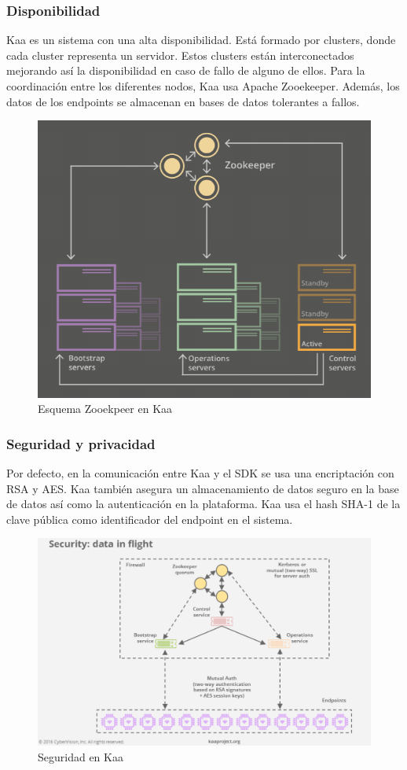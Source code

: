 \documentclass[12pt, twoside]{book}
\begin{document}
\subsubsection*{Disponibilidad}
Kaa es un sistema con una alta disponibilidad. Está formado por clusters, donde cada cluster representa un servidor. Estos clusters están interconectados mejorando así la disponibilidad en caso de fallo de alguno de ellos. Para la coordinación entre los diferentes nodos, Kaa usa Apache Zooekeeper. Además, los datos de los endpoints se almacenan en bases de datos tolerantes a fallos.
\begin{figure}[H]
\centering
\includegraphics[scale=0.5]{images/disponibilidad_captura}
\caption{Esquema Zooekpeer en Kaa}\label{L509}
\end{figure} 

\subsubsection*{Seguridad y privacidad}
Por defecto, en la comunicación entre Kaa y el SDK se usa una encriptación con RSA y AES. Kaa también asegura un almacenamiento de datos seguro en la base de datos así como la autenticación en la plataforma. Kaa usa el hash SHA-1 de la clave pública como identificador del endpoint en el sistema.
\begin{figure}[H]
\centering
\includegraphics[scale=0.5]{images/security_capture}
\caption{Seguridad en Kaa}\label{L510}
\end{figure} 
\end{document}
